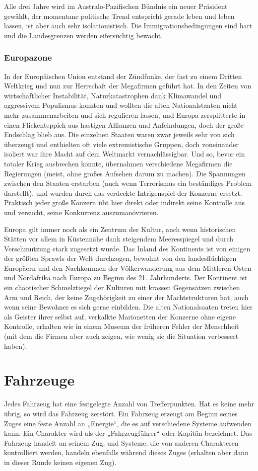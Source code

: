 Alle drei Jahre wird im Australo-Pazifischen Bündnis ein neuer Präsident gewählt, der momentane politische Trend entspricht gerade \glqq leben und leben lassen\grqq{}, ist aber auch sehr isolationistisch. Die Immigrationsbedingungen sind hart und die Landesgrenzen werden eifersüchtig bewacht.
\subsubsection{Europazone}
In der Europäischen Union entstand der Zündfunke, der fast zu einem Dritten Weltkrieg und nun zur Herrschaft der Megafirmen geführt hat. In den Zeiten von wirtschaftlicher Instabilität, Naturkatastrophen dank Klimawandel und aggressivem Populismus konnten und wollten die alten Nationalstaaten nicht mehr zusammenarbeiten und sich regulieren lassen, und Europa zersplitterte in einen Flickenteppich aus hastigen Allianzen und Anfeindungen, doch der große Endschlag blieb aus. Die einzelnen Staaten waren zwar jeweils sehr von sich überzeugt und enthielten oft viele extremistische Gruppen, doch voneinander isoliert war ihre Macht auf dem Weltmarkt vernachlässigbar. Und so, bevor ein totaler Krieg ausbrechen konnte, übernahmen verschiedene Megafirmen die Regierungen (meist, ohne großes Aufsehen darum zu machen). Die Spannungen zwischen den Staaten erstarben (auch wenn Terrorismus ein beständiges Problem darstellt), und wurden durch das verdeckte Intrigenspiel der Konzerne ersetzt. Praktisch jeder große Konzern übt hier direkt oder indirekt seine Kontrolle aus und versucht, seine Konkurrenz auszumanövrieren.

Europa gilt immer noch als ein Zentrum der Kultur, auch wenn historischen Stätten vor allem in Küstennähe dank steigendem Meeresspiegel und durch Verschmutzung stark zugesetzt wurde. Das Inland des Kontinents ist von einigen der größten Sprawls der Welt durchzogen, bewohnt von den landesflüchtigen Europäern und den Nachkommen der Völkerwanderung aus dem Mittleren Osten und Nordafrika nach Europa zu Beginn des 21. Jahrhunderts. Der Kontinent ist ein chaotischer Schmelztiegel der Kulturen mit krassen Gegensätzen zwischen Arm und Reich, der keine Zugehörigkeit zu einer der Machtstrukturen hat, auch wenn seine Bewohner es sich gerne einbilden. Die alten Nationalsaaten treten hier als Geister ihrer selbst auf, verkalkte Marionetten der Konzerne ohne eigene Kontrolle, erhalten wie in einem Museum der früheren Fehler der Menschheit (mit dem die Firmen aber auch zeigen, wie wenig sie die Situation verbessert haben).
\section{Fahrzeuge}
Jedes Fahrzeug hat eine festgelegte Anzahl von Trefferpunkten. Hat es keine mehr übrig, so wird das Fahrzeug zerstört. Ein Fahrzeug erzeugt am Beginn seines Zuges eine feste Anzahl an „Energie“, die es auf verschiedene Systeme aufwenden kann. Ein Charakter wird als der „Fahrzeugführer“ oder Kapitän bezeichnet. Das Fahrzeug handelt an seinem Zug, und Systeme, die von anderen Charakteren kontrolliert werden, handeln ebenfalls während dieses Zuges (erhalten aber dann in dieser Runde keinen eigenen Zug).

